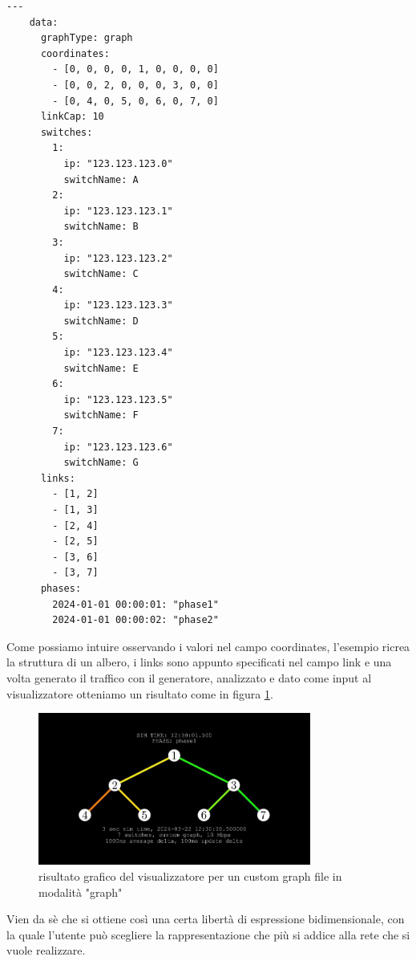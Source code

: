 \documentclass[binding=0.6cm]{sapthesis}
\begin{document}
{\scriptsize %
\begin{lstlisting}[caption={esempio di custom graph file, graphType posto al valore graph}]
    ---
    data:
      graphType: graph
      coordinates:
        - [0, 0, 0, 0, 1, 0, 0, 0, 0]
        - [0, 0, 2, 0, 0, 0, 3, 0, 0]
        - [0, 4, 0, 5, 0, 6, 0, 7, 0]
      linkCap: 10
      switches:
        1:
          ip: "123.123.123.0"
          switchName: A
        2:
          ip: "123.123.123.1"
          switchName: B
        3:
          ip: "123.123.123.2"
          switchName: C
        4:
          ip: "123.123.123.3"
          switchName: D
        5:
          ip: "123.123.123.4"
          switchName: E
        6:
          ip: "123.123.123.5"
          switchName: F
        7:
          ip: "123.123.123.6"
          switchName: G
      links:
        - [1, 2]
        - [1, 3]
        - [2, 4]
        - [2, 5]
        - [3, 6]
        - [3, 7]
      phases:
        2024-01-01 00:00:01: "phase1"
        2024-01-01 00:00:02: "phase2"
\end{lstlisting}
}

Come possiamo intuire osservando i valori nel campo coordinates, l'esempio ricrea la struttura di un albero, i links sono appunto specificati 
nel campo link e una volta generato il traffico con il generatore, analizzato e dato come input 
al visualizzatore otteniamo un risultato come in figura \ref{fig:tree_custom}.
\newline
\begin{figure}[h]
    \centering
    \includegraphics[width=0.8\textwidth]{immagini/free_graph.JPG}
    \caption{risultato grafico del visualizzatore per un custom graph file in modalità "graph"}
    \label{fig:tree_custom}
\end{figure}
Vien da sè che si ottiene così una certa libertà di espressione bidimensionale, con la quale l'utente può scegliere
la rappresentazione che più si addice alla rete che si vuole realizzare.
\end{document}
